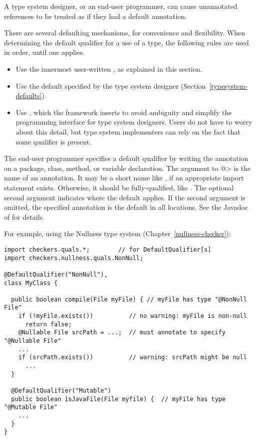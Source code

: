 A type system designer, or an end-user programmer, can cause unannotated
references to be treated as if they had a default annotation.

There are several defaulting mechanisms, for convenience and flexibility.
When determining the default qualifier for a use of a type, the following
rules are used in order, until one applies.
\begin{itemize}
\item
  Use the innermost user-written , as explained in
  this section.
\item
  Use the default specified by the type system designer
  (Section~\ref{typesystem-defaults}).
\item
  Use , which the framework
  inserts to avoid ambiguity and simplify the programming interface for
  type system designers.  Users do not have to worry about this detail,
  but type system implementers can rely on the fact that some
  qualifier is present.
\end{itemize}



The end-user programmer specifies a default qualifier by writing the 
annotation on a package, class, method, or variable declaration.  The
argument to \<@> is the 
name of an annotation.  It may be a short name like , if an
appropriate import statement exists.  Otherwise, it should be
fully-qualified, like .
The optional second argument indicates where the default
applies.  If the second argument is omitted, the specified annotation is
the default in all locations.  See the Javadoc of  for details.

For example, using the Nullness type system (Chapter~\ref{nullness-checker}):

\begin{Verbatim}
import checkers.quals.*;        // for DefaultQualifier[s]
import checkers.nullness.quals.NonNull;

@DefaultQualifier("NonNull"),
class MyClass {

  public boolean compile(File myFile) { // myFile has type "@NonNull File"
    if (!myFile.exists())          // no warning: myFile is non-null
      return false;
    @Nullable File srcPath = ...;  // must annotate to specify "@Nullable File"
    ...
    if (srcPath.exists())          // warning: srcPath might be null
      ...
  }

  @DefaultQualifier("Mutable")
  public boolean isJavaFile(File myfile) {  // myFile has type "@Mutable File"
    ...
  }
}
\end{Verbatim}

